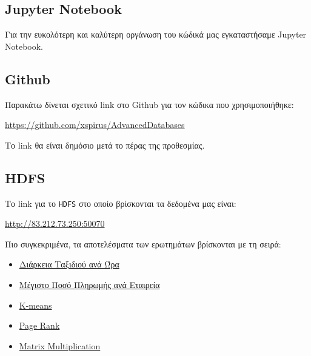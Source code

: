\documentclass{ntua}
\begin{document}
\subsection{Jupyter Notebook}
Για την ευκολότερη και καλύτερη οργάνωση του κώδικά μας εγκαταστήσαμε Jupyter Notebook.

\subsection{Github}
Παρακάτω δίνεται σχετικό link στο Github για τον κώδικα που χρησιμοποιήθηκε:
\begin{center}
\url{https://github.com/xspirus/AdvancedDatabases}
\end{center}
\noindent
Το link θα είναι δημόσιο μετά το πέρας της προθεσμίας.

\subsection{HDFS}
Το link για το \texttt{HDFS} στο οποίο βρίσκονται τα δεδομένα μας είναι:
\begin{center}
\url{http://83.212.73.250:50070}
\end{center}
Πιο συγκεκριμένα, τα αποτελέσματα των ερωτημάτων βρίσκονται με τη σειρά:
\begin{itemize}
	\item \href{http://83.212.73.250:50070/explorer.html\#/Project/TripDuration}{Διάρκεια Ταξιδιού ανά Ώρα}
	\item \href{http://83.212.73.250:50070/explorer.html\#/Project/MaxAmountPaid}{Μέγιστο Ποσό Πληρωμής ανά Εταιρεία}
	\item \href{http://83.212.73.250:50070/explorer.html#/Project/Centroids}{K-means}
	\item \href{http://83.212.73.250:50070/explorer.html#/Project/PageRank}{Page Rank}
	\item \href{http://83.212.73.250:50070/explorer.html#/Project/Matrix}{Matrix Multiplication}
\end{itemize}
\end{document}
